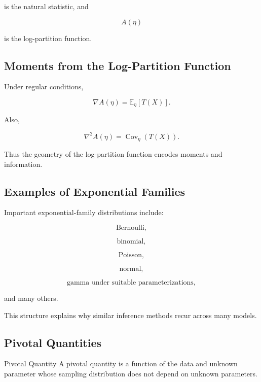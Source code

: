 is the natural statistic, and

\[
A(\eta)
\]

is the log-partition function.

\subsection{Moments from the Log-Partition Function}
\label{subsec:log-partition-moments}

Under regular conditions,

\[
\boxed{
\nabla A(\eta)
=
\mathbb{E}_\eta[T(X)].
}
\]

Also,

\[
\boxed{
\nabla^2 A(\eta)
=
\operatorname{Cov}_\eta
(
T(X)
).
}
\]

Thus the geometry of the log-partition function encodes moments and
information.

\subsection{Examples of Exponential Families}
\label{subsec:exponential-family-examples}

Important exponential-family distributions include:

\[
\boxed{
\text{Bernoulli},
}
\]

\[
\boxed{
\text{binomial},
}
\]

\[
\boxed{
\text{Poisson},
}
\]

\[
\boxed{
\text{normal},
}
\]

\[
\boxed{
\text{gamma under suitable parameterizations},
}
\]

and many others.

This structure explains why similar inference methods recur across many
models.

\subsection{Pivotal Quantities}
\label{subsec:pivotal-quantities}

\begin{definitionbox}{Pivotal Quantity}
A pivotal quantity is a function of the data and unknown parameter whose
sampling distribution does not depend on unknown parameters.
\end{definitionbox}

